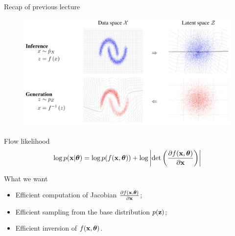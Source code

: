 

\begin{frame}
\titlepage
\end{frame}
\begin{frame}{Recap of previous lecture}
	\begin{figure}
		\includegraphics[width=0.7\linewidth]{figs/flows_how2.png}
	\end{figure}
	\vspace{-0.3cm}
		\begin{block}{Flow likelihood}
			\vspace{-0.3cm}
			\[
			\log p(\mathbf{x}|\boldsymbol{\theta}) = \log p(f(\mathbf{x}, \boldsymbol{\theta})) + \log \left|\det \left( \frac{\partial f(\mathbf{x}, \boldsymbol{\theta})}{\partial \mathbf{x}} \right) \right|
			\]
			\vspace{-0.5cm}
		\end{block}
		\begin{block}{What we want}
			\begin{itemize}
				\item Efficient computation of Jacobian $\frac{\partial f(\mathbf{x}, \boldsymbol{\theta})}{\partial \mathbf{x}}$;
				\item Efficient sampling from the base distribution $p(\mathbf{z})$;
				\item Efficient inversion of $f(\mathbf{x}, \boldsymbol{\theta})$.
			\end{itemize}
			
		\end{block}
\end{frame}
